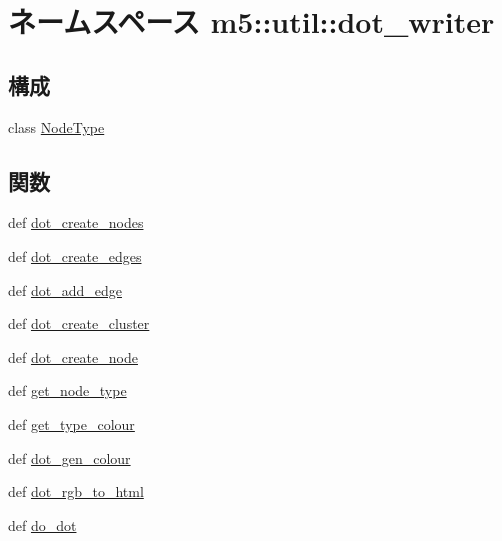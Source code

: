 \hypertarget{namespacem5_1_1util_1_1dot__writer}{
\section{ネームスペース m5::util::dot\_\-writer}
\label{namespacem5_1_1util_1_1dot__writer}
}
\subsection*{構成}
\begin{DoxyCompactItemize}
\item 
class \hyperlink{classm5_1_1util_1_1dot__writer_1_1NodeType}{NodeType}
\end{DoxyCompactItemize}
\subsection*{関数}
\begin{DoxyCompactItemize}
\item 
def \hyperlink{namespacem5_1_1util_1_1dot__writer_add31984cb8657529c3421202a51a7dc0}{dot\_\-create\_\-nodes}
\item 
def \hyperlink{namespacem5_1_1util_1_1dot__writer_a6f29e1e4547e1ba7ec5fe675dfb1a079}{dot\_\-create\_\-edges}
\item 
def \hyperlink{namespacem5_1_1util_1_1dot__writer_a1fff52253a51b807eca402644554e628}{dot\_\-add\_\-edge}
\item 
def \hyperlink{namespacem5_1_1util_1_1dot__writer_a2444e15cbf160c23ba843c38960063b5}{dot\_\-create\_\-cluster}
\item 
def \hyperlink{namespacem5_1_1util_1_1dot__writer_ad6620c2cbb99013162bcbc566c5b0378}{dot\_\-create\_\-node}
\item 
def \hyperlink{namespacem5_1_1util_1_1dot__writer_a498b4029e58b118de7ca1b994d70234c}{get\_\-node\_\-type}
\item 
def \hyperlink{namespacem5_1_1util_1_1dot__writer_a7bba31405ed25bdf7a33744c7e90b502}{get\_\-type\_\-colour}
\item 
def \hyperlink{namespacem5_1_1util_1_1dot__writer_a61d8e0385c2049fd69ddf1bc7b944b7d}{dot\_\-gen\_\-colour}
\item 
def \hyperlink{namespacem5_1_1util_1_1dot__writer_a7583ad2189f2e3cdd087d9d5e62ce1af}{dot\_\-rgb\_\-to\_\-html}
\item 
def \hyperlink{namespacem5_1_1util_1_1dot__writer_ae1c22e483b943c09e1d17ebc09c4b5f2}{do\_\-dot}
\end{DoxyCompactItemize}
